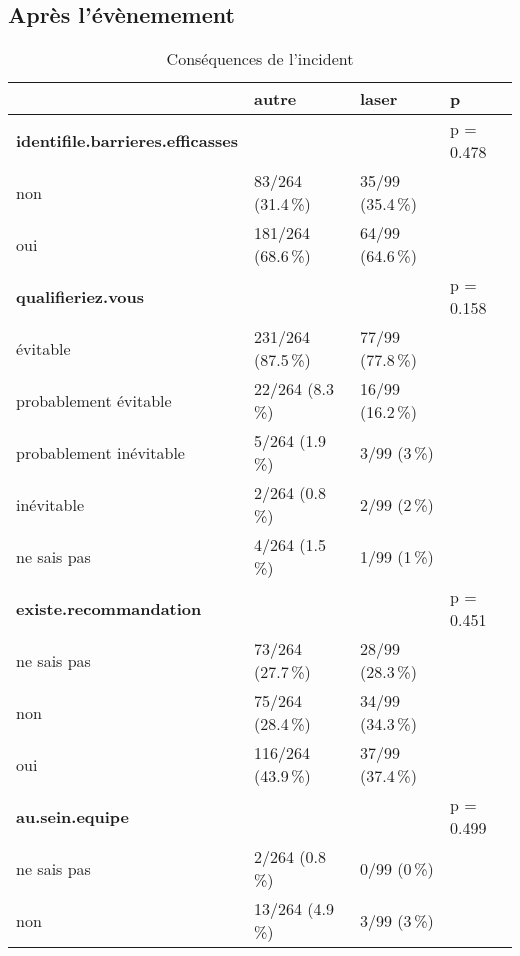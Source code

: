 \documentclass[a4paper,fontsize=10pt,french]{scrartcl}
\begin{document}
\subsection{Après l'évènemement}\label{apruxe8s-luxe9vuxe8nemement}

\begin{table}

\caption{\label{tab:tabcomp}Conséquences de l'incident}
\centering
\begin{tabular}[t]{l|l|l|l}
  \toprule
  & autre & laser & p\\
\midrule
\textbf{identifile.barrieres.efficasses} &  &  & p = 0.478\\
 
non & 83/264 (31.4\,\%) & 35/99 (35.4\,\%) & \\
 
oui & 181/264 (68.6\,\%) & 64/99 (64.6\,\%) & \\
\midrule
\textbf{qualifieriez.vous} &  &  & p = 0.158\\
 
évitable & 231/264 (87.5\,\%) & 77/99 (77.8\,\%) & \\
 
probablement évitable & 22/264 (8.3\,\%) & 16/99 (16.2\,\%) & \\
 
probablement inévitable & 5/264 (1.9\,\%) & 3/99 (3\,\%) & \\
 
inévitable & 2/264 (0.8\,\%) & 2/99 (2\,\%) & \\
 
ne sais pas & 4/264 (1.5\,\%) & 1/99 (1\,\%) & \\
\midrule
\textbf{existe.recommandation} &  &  & p = 0.451\\
 
ne sais pas & 73/264 (27.7\,\%) & 28/99 (28.3\,\%) & \\
 
non & 75/264 (28.4\,\%) & 34/99 (34.3\,\%) & \\
 
oui & 116/264 (43.9\,\%) & 37/99 (37.4\,\%) & \\
\midrule
\textbf{au.sein.equipe} &  &  & p = 0.499\\
 
ne sais pas & 2/264 (0.8\,\%) & 0/99 (0\,\%) & \\
 
non & 13/264 (4.9\,\%) & 3/99 (3\,\%) & \\
 

\end{tabular}
\end{table}
\end{document}
